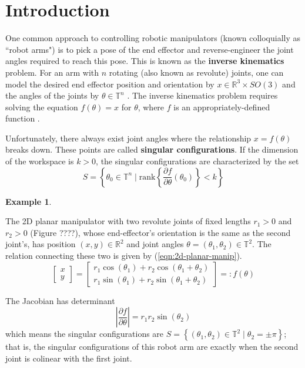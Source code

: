 \documentclass[12pt]{article}
\theoremstyle{definition}
\newtheorem{example}{Example}
\begin{document}
    
\section{Introduction}
One common approach to controlling robotic manipulators 
(known colloquially as ``robot arms") is to pick a pose of the end effector and
reverse-engineer the joint angles required to reach this pose. This is known as
the \textbf{inverse kinematics} problem. For an arm with \(n\) rotating 
(also known as revolute) joints, one can model the desired end effector position
and orientation by \(x \in \mathbb{R}^3 \times SO(3)\) and the angles of the
joints by \(\theta \in \mathbb{T}^n\) \cite{robots-fiber-bundles}. 
The inverse kinematics problem requires solving the
equation \(f(\theta) = x\) for \(\theta\), where \(f\) is an 
appropriately-defined function \cite{program-kin-red-manips}.

Unfortunately, there always exist joint angles where the relationship 
\(x = f(\theta)\) breaks down. These points are called 
\textbf{singular configurations}. If the dimension of the workspace is 
\(k > 0\), the singular configurations are characterized by the set
\[
    S = \left\{ \theta_0 \in \mathbb{T}^n \mid 
    \text{rank}\left\{
        \frac{\partial f}{\partial\theta}(\theta_0) 
    \right\} < k \right\}
\]

\begin{example}

    \begin{figure}

        \caption{}\label{fig:2-link-arm}
    \end{figure}
    The 2D planar manipulator with two revolute joints of fixed lengths \(r_1 > 0\)
and \(r_2 > 0\) (Figure ????), whose end-effector's orientation is the same
as the second joint's, has position \((x,y) \in \mathbb{R}^2\) and joint angles 
\(\theta = (\theta_1,\theta_2) \in \mathbb{T}^2\). 
The relation connecting these two is given by (\ref{eqn:2d-planar-manip}).
\begin{equation}\label{eqn:2d-planar-manip}
    \begin{bmatrix}x \\ y \end{bmatrix}
    = \begin{bmatrix} 
        r_1\cos(\theta_1) + r_2\cos(\theta_1 + \theta_2) \\
        r_1\sin(\theta_1) + r_2\sin(\theta_1 + \theta_2)
    \end{bmatrix} =: f(\theta)
\end{equation}

The Jacobian has determinant
\[
    \left| \frac{\partial f}{\partial \theta} \right| = r_1r_2\sin(\theta_2)
\]
which means the singular configurations are 
\(S = \left\{ (\theta_1,\theta_2) \in \mathbb{T}^2 \mid \theta_2 = \pm\pi\right\}\); 
that is, the singular configurations of this robot arm are exactly when the
second joint is colinear with the first joint.
\end{example}
\end{document}
